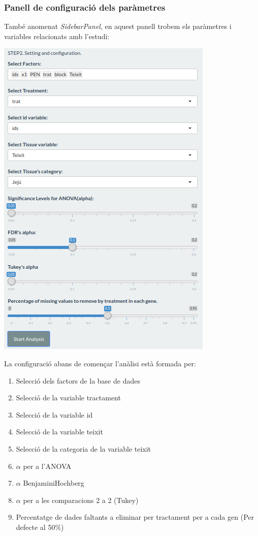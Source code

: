 \documentclass[english]{article}
\begin{document}
\subsubsection{Panell de configuració dels paràmetres}
També anomenat \textit{SidebarPanel}, en aquest panell trobem els paràmetres i variables relacionats amb l'estudi:
\begin{center}
\includegraphics[scale=0.4]{app2.png}
\end{center}
La configuració abans de comen\c{c}ar l'anàlisi està formada per:
\begin{enumerate}
\item Selecció dels factors de la base de dades
\item Selecció de la variable tractament
\item Selecció de la variable id
\item Selecció de la variable teixit
\item Selecció de la categoria de la variable teixit
\item $\alpha$ per a l'ANOVA
\item $\alpha$ BenjaminiHochberg
\item $\alpha$ per a les comparacions 2 a 2 (Tukey)
\item Percentatge de dades faltants a eliminar per tractament per a cada gen (Per defecte al 50$\%$)
\end{enumerate}
\newpage
\end{document}
